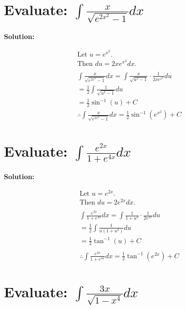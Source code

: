 \documentclass{article}
\begin{document}
\section{Evaluate: $\int \frac{x}{\sqrt{e^{2x^2} - 1}} dx$}
\textbf{Solution:}

\begin{align*}
     & \text{Let } u = e^{x^2}.                                                                            \\
     & \text{Then } du = 2x e^{x^2} dx.                                                                    \\
    \\
     & \int \frac{x}{\sqrt{e^{2x^2} - 1}} dx = \int \frac{x}{\sqrt{u^2 - 1}} \cdot \frac{1}{2x e^{x^2}} du \\
     & = \frac{1}{2} \int \frac{1}{\sqrt{u^2 - 1}} du                                                      \\
     & = \frac{1}{2} \sin^{-1}(u) + C \
    \\
     & \therefore \int \frac{x}{\sqrt{e^{2x^2} - 1}} dx = {\frac{1}{2} \sin^{-1}(e^{x^2}) + C}
\end{align*}

\newpage
\section{Evaluate: $\int \frac{e^{2x}}{1 + e^{4x}} dx$}

\textbf{Solution:}

\begin{align*}
     & \text{Let } u = e^{2x}.                                                               \\
     & \text{Then } du = 2e^{2x} dx.                                                         \\
    \\
     & \int \frac{e^{2x}}{1 + e^{4x}} dx = \int \frac{1}{1 + u^2} \cdot \frac{1}{2e^{2x}} du \\
     & = \frac{1}{2} \int \frac{1}{u(1 + u^2)} du                                            \\
     & = \frac{1}{2} \tan^{-1}(u) + C                                                        \\
    \\
     & \therefore \int \frac{e^{2x}}{1 + e^{4x}} dx = {\frac{1}{2} \tan^{-1}(e^{2x}) + C}
\end{align*}

\section{Evaluate: $\int \frac{3x}{\sqrt{1 - x^4}} dx$}
\end{document}
